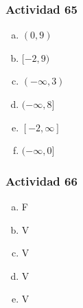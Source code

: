 \documentclass[a4paper, twocolumn]{article}
\begin{document}
\subsubsection*{Actividad 65}
\begin{enumerate}[a)]
		  \item $(0,9)$
		  \item $[-2,9)$
		  \item $(-\infty,3)$
		  \item $(-\infty,8]$
		  \item $[-2,\infty]$
		  \item $(-\infty,0]$
\end{enumerate}
\subsubsection*{Actividad 66}
\begin{enumerate}[a)]
		  \item F
		  \item V
		  \item V
		  \item V
		  \item V
\end{enumerate}

%





\end{document}
